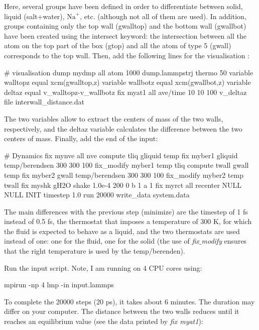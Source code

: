 \noindent Here, several groups have been defined in order to differentiate
between solid, liquid (salt+water), $\text{Na}^+$, etc. (although
not all of them are used). In addition, groups containing only the
top wall (gwalltop) and the bottom wall (gwallbot) have been
created using the intersect keyword: the intersection
between all the atom on the top part of the box (gtop) and
all the atom of type 5 (gwall) corresponds to the top wall.
Then, add the following lines for the visualisation :

\begin{lcverbatim}
# visualisation
dump mydmp all atom 1000 dump.lammpstrj
thermo 50
variable walltopz equal xcm(gwalltop,z)
variable wallbotz equal xcm(gwallbot,z)
variable deltaz equal v_walltopz-v_wallbotz
fix myat1 all ave/time 10 10 100 v_deltaz file interwall_distance.dat
\end{lcverbatim}

\noindent The two variables allow to extract the centers of mass of
the two walls, respectively, and the deltaz variable
calculates the difference between the two centers of mass.
Finally, add the end of the input:

\begin{lcverbatim}
# Dynamics
fix mynve all nve
compute tliq gliquid temp
fix myber1 gliquid temp/berendsen 300 300 100
fix_modify myber1 temp tliq
compute twall gwall temp
fix myber2 gwall temp/berendsen 300 300 100
fix_modify myber2 temp twall
fix myshk gH2O shake 1.0e-4 200 0 b 1 a 1
fix myrct all recenter NULL NULL INIT
timestep 1.0
run 20000
write_data system.data
\end{lcverbatim}

\noindent The main differences with the previous step (minimize) are
the timestep of 1 fs instead of 0.5 fs, the thermostat that imposes a temperature of 300 K, for which the
fluid is expected to behave as a liquid, and the two thermostats are used instead of one:
one for the fluid, one for the solid (the use of \textit{fix$\_$modify} ensures
that the right temperature is used by the temp/berenden).

Run the input script. Note, I am running on 4 CPU cores using:

\begin{lcverbatim}
mpirun -np 4 lmp -in input.lammps
\end{lcverbatim}

\noindent To complete the 20000 steps (20 ps), it takes about 6 minutes. The duration 
may differ on your computer.
The distance between the two walls
reduces until it reaches an equilibrium value (see the data
printed by \textit{fix myat1}):

